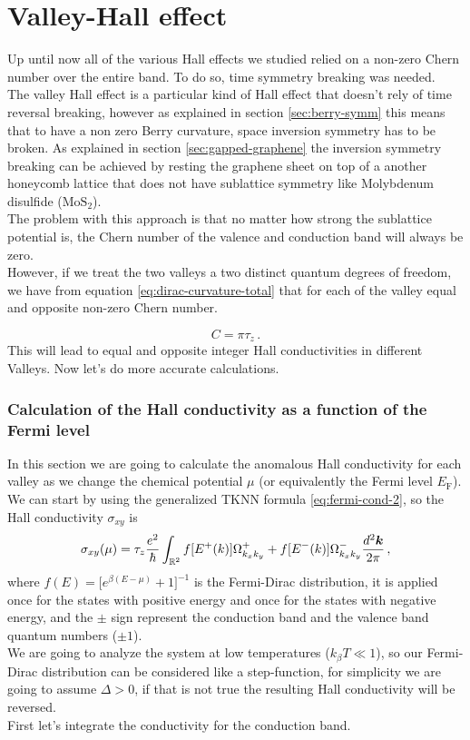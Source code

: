 \section{Valley-Hall effect}
Up until now all of the various Hall effects we studied relied on a non-zero Chern number over the entire band. To do so, time symmetry breaking was needed.\\
The valley Hall effect is a particular kind of Hall effect that doesn't rely of time reversal breaking, however as explained in section \ref{sec:berry-symm} this means that to have a non zero Berry curvature, space inversion symmetry has to be broken. As explained in section \ref{sec:gapped-graphene} the inversion symmetry breaking can be achieved by resting the graphene sheet on top of a another honeycomb lattice that does not have sublattice symmetry like Molybdenum disulfide ($\textrm{MoS}_2$).\\
The problem with this approach is that no matter how strong the sublattice potential is, the Chern number of the valence and conduction band will always be zero.\\
However, if we treat the two valleys a two distinct quantum degrees of freedom, we have from equation \ref {eq:dirac-curvature-total} that for each of the valley equal and opposite non-zero Chern number.

\begin{equation}
    C=\pi\tau_z\,.
\end{equation}
This will lead to equal and opposite integer Hall conductivities in different Valleys. Now let's do more accurate calculations.

\subsubsection*{Calculation of the Hall conductivity as a function of the Fermi level}
In this section we are going to calculate the anomalous Hall conductivity for each valley as we change the chemical potential $\mu$ (or equivalently the Fermi level $E_\textrm{F}$). We can start by using the generalized TKNN formula \ref{eq:fermi-cond-2}, so the Hall conductivity $\sigma_{xy}$ is 
\begin{equation}
    \sigma_{xy}(\mu)=\tau_z\frac{e^2}\hbar \int_{\mathbb R^2} f[E^+(k)]\Omega^+_{k_xk_y}+f[E^-(k)]\Omega^-_{k_xk_y}\frac{d^2\boldsymbol{k}}{2\pi}\,,
    \label{eq:valley-conductivity-1}
\end{equation}
where $f(E)=\big[e^{\beta (E-\mu)}+1\big]^{-1}$ is the Fermi-Dirac distribution, it is applied once for the states with positive energy and once for the states with negative energy, and the $\pm$ sign represent the conduction band and the valence band quantum numbers ($\pm 1$).\\
We are going to analyze the system at low temperatures ($k_\beta T\ll 1$), so our Fermi-Dirac distribution can be considered like a step-function, for simplicity we are going to assume $\Delta>0$, if that is not true the resulting Hall conductivity will be reversed.\\
First let's integrate the conductivity for the conduction band.

